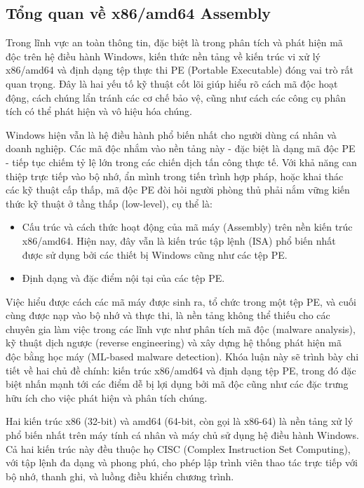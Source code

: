 \subsection{Tổng quan về x86/amd64 Assembly}

Trong lĩnh vực an toàn thông tin, đặc biệt là trong phân tích và
phát hiện mã độc trên hệ điều hành Windows, kiến thức nền tảng về
kiến trúc vi xử lý x86/amd64 và định dạng tệp thực thi PE
(Portable Executable) đóng vai trò rất quan trọng. Đây là hai
yếu tố kỹ thuật cốt lõi giúp hiểu rõ cách mã độc hoạt động,
cách chúng lẩn tránh các cơ chế bảo vệ, cũng như cách các
công cụ phân tích có thể phát hiện và vô hiệu hóa chúng.

Windows hiện vẫn là hệ điều hành phổ biến nhất cho người dùng
cá nhân và doanh nghiệp. Các mã độc nhắm vào nền tảng này - đặc
biệt là dạng mã độc PE - tiếp tục chiếm tỷ lệ lớn trong các
chiến dịch tấn công thực tế. Với khả năng can thiệp trực tiếp
vào bộ nhớ, ẩn mình trong tiến trình hợp pháp, hoặc khai thác
các kỹ thuật cấp thấp, mã độc PE đòi hỏi người phòng thủ phải
nắm vững kiến thức kỹ thuật ở tầng thấp (low-level), cụ thể là:

\begin{itemize}
    \item Cấu trúc và cách thức hoạt động của mã máy (Assembly)
	trên nền kiến trúc x86/amd64. Hiện nay, đây vẫn là kiến trúc
	tập lệnh (ISA) phổ biến nhất được sử dụng bởi các thiết bị
	Windows cũng như các tệp PE.
    \item Định dạng và đặc điểm nội tại của các tệp PE.
\end{itemize}

Việc hiểu được cách các mã máy được sinh ra, tổ chức trong
một tệp PE, và cuối cùng được nạp vào bộ nhớ và thực thi,
là nền tảng không thể thiếu cho các chuyên gia làm việc trong
các lĩnh vực như phân tích mã độc (malware analysis), kỹ thuật
dịch ngược (reverse engineering) và xây dựng hệ thống phát
hiện mã độc bằng học máy (ML-based malware detection).
Khóa luận này sẽ trình bày chi tiết về hai chủ đề chính:
kiến trúc x86/amd64 và định dạng tệp PE, trong đó đặc biệt
nhấn mạnh tới các điểm dễ bị lợi dụng bởi mã độc cũng như
các đặc trưng hữu ích cho việc phát hiện và phân tích chúng.

Hai kiến trúc x86 (32-bit) và amd64 (64-bit, còn gọi là x86-64)
là nền tảng xử lý phổ biến nhất trên máy tính cá nhân và máy chủ
sử dụng hệ điều hành Windows. Cả hai kiến trúc này đều thuộc họ
CISC (Complex Instruction Set Computing), với tập lệnh đa dạng
và phong phú, cho phép lập trình viên thao tác trực tiếp với
bộ nhớ, thanh ghi, và luồng điều khiển chương trình. \cite{intel-sdm} \cite{amd64-manual} \cite{ms-x64-calling}

